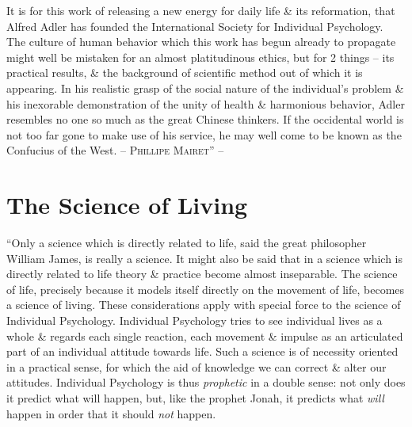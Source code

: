 \documentclass{article}
\begin{document}
It is for this work of releasing a new energy for daily life \& its reformation, that Alfred Adler has founded the International Society for Individual Psychology. The culture of human behavior which this work has begun already to propagate might well be mistaken for an almost platitudinous ethics, but for 2 things -- its practical results, \& the background of scientific method out of which it is appearing. In his realistic grasp of the social nature of the individual's problem \& his inexorable demonstration of the unity of health \& harmonious behavior, Adler resembles no one so much as the great Chinese thinkers. If the occidental world is not too far gone to make use of his service, he may well come to be known as the Confucius of the West. -- \textsc{Phillipe Mairet}'' -- \cite[pp. 9--30]{Adler_science_living}


\section{The Science of Living}
``Only a science which is directly related to life, said the great philosopher William James, is really a science. It might also be said that in a science which is directly related to life theory \& practice become almost inseparable. The science of life, precisely because it models itself directly on the movement of life, becomes a science of living. These considerations apply with special force to the science of Individual Psychology. Individual Psychology tries to see individual lives as a whole \& regards each single reaction, each movement \& impulse as an articulated part of an individual attitude towards life. Such a science is of necessity oriented in a practical sense, for which the aid of knowledge we can correct \& alter our attitudes. Individual Psychology is thus \textit{prophetic} in a double sense: not only does it predict what will happen, but, like the prophet Jonah, it predicts what \textit{will} happen in order that it should \textit{not} happen.
\end{document}
